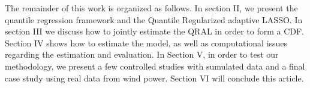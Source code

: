 The remainder of this work is organized as follows. In section II, we present the quantile regression framework and the Quantile Regularized adaptive LASSO. In section III we discuss how to jointly estimate the QRAL in order to form a CDF. Section IV shows how to estimate the model, as well as computational issues regarding the estimation and evaluation. In Section V, in order to test our methodology, we present a few controlled studies with sumulated data and a final case study using real data from wind power. Section VI will conclude this article.
